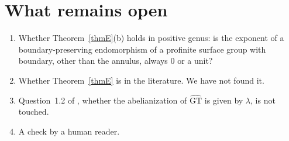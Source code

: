 \documentclass[11pt]{amsart}
\theoremstyle{definition}
\theoremstyle{remark}
\newcommand{\GT}{\widehat{\mathrm{GT}}}
\begin{document}
\section{What remains open}
\begin{enumerate}
\item Whether Theorem~\ref{thmE}(b) holds in positive genus: is the exponent of a boundary-preserving endomorphism of a profinite surface group with boundary, other than the annulus, always $0$ or a unit?
\item Whether Theorem~\ref{thmE} is in the literature. We have not found it.
\item Question~1.2 of \cite{LS}, whether the abelianization of $\GT$ is given by $\lambda$, is not touched.
\item A check by a human reader.
\end{enumerate}
\end{document}
